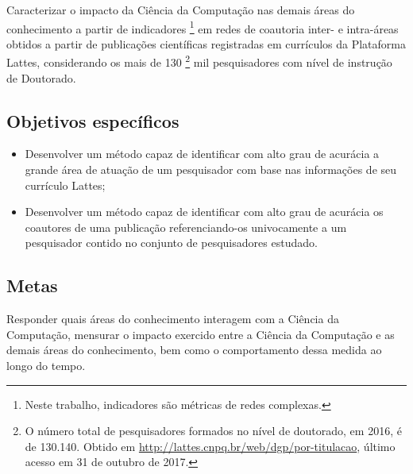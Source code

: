 Caracterizar o impacto da Ciência da Computação nas demais áreas do conhecimento a partir de indicadores \footnote{Neste trabalho, indicadores são métricas de redes complexas.} em redes de coautoria inter- e intra-áreas obtidos a partir de publicações científicas registradas em currículos da Plataforma Lattes, considerando os mais de 130 \footnote{O número total de pesquisadores formados no nível de doutorado, em 2016, é de 130.140. Obtido em \url{http://lattes.cnpq.br/web/dgp/por-titulacao}, último acesso em 31 de outubro de 2017.} mil pesquisadores com nível de instrução de Doutorado.

\subsection{Objetivos específicos}

\begin{itemize}
\item Desenvolver um método capaz de identificar com alto grau de acurácia a grande área de atuação de um pesquisador com base nas informações de seu currículo Lattes;
\item Desenvolver um método capaz de identificar com alto grau de acurácia os coautores de uma publicação referenciando-os univocamente a um pesquisador contido no conjunto de pesquisadores estudado.
\end{itemize}

\subsection{Metas}

Responder quais áreas do conhecimento interagem com a Ciência da Computação, mensurar o impacto exercido entre a Ciência da Computação e as demais áreas do conhecimento, bem como o comportamento dessa medida ao longo do tempo.

